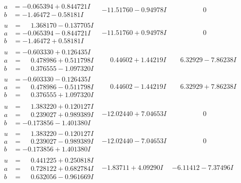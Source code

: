 \documentclass[1p]{elsarticle_modified}
\theoremstyle{definition}
\begin{document}
$$\begin{array}{c|c|c}
\begin{aligned}
a &= -0.065394 + 0.844721 I \\
b &= -1.46472 - 0.58181 I\end{aligned}
 & -11.51760 - 0.94978 I & \phantom{-0.000000 } 0 \\ \hline\begin{aligned}
u &= \phantom{-}1.368170 - 0.137705 I \\
a &= -0.065394 - 0.844721 I \\
b &= -1.46472 + 0.58181 I\end{aligned}
 & -11.51760 + 0.94978 I & \phantom{-0.000000 } 0 \\ \hline\begin{aligned}
u &= -0.603330 + 0.126435 I \\
a &= \phantom{-}0.478986 + 0.511798 I \\
b &= \phantom{-}0.376555 - 1.097320 I\end{aligned}
 & \phantom{-}0.44602 + 1.44219 I & \phantom{-}6.32929 - 7.86238 I \\ \hline\begin{aligned}
u &= -0.603330 - 0.126435 I \\
a &= \phantom{-}0.478986 - 0.511798 I \\
b &= \phantom{-}0.376555 + 1.097320 I\end{aligned}
 & \phantom{-}0.44602 - 1.44219 I & \phantom{-}6.32929 + 7.86238 I \\ \hline\begin{aligned}
u &= \phantom{-}1.383220 + 0.120127 I \\
a &= \phantom{-}0.239027 + 0.989389 I \\
b &= -0.173856 - 1.401380 I\end{aligned}
 & -12.02440 + 7.04653 I & \phantom{-0.000000 } 0 \\ \hline\begin{aligned}
u &= \phantom{-}1.383220 - 0.120127 I \\
a &= \phantom{-}0.239027 - 0.989389 I \\
b &= -0.173856 + 1.401380 I\end{aligned}
 & -12.02440 - 7.04653 I & \phantom{-0.000000 } 0 \\ \hline\begin{aligned}
u &= \phantom{-}0.441225 + 0.250818 I \\
a &= \phantom{-}0.728122 + 0.682784 I \\
b &= \phantom{-}0.632056 - 0.961669 I\end{aligned}
 & -1.83711 + 4.09290 I & -6.11412 - 7.37496 I \\ \hline\begin{aligned}

\end{aligned}
\end{array}$$
\end{document}
